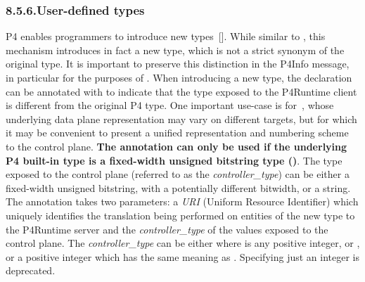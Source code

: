 \documentclass[11pt]{article}
\begin{document}
{%
\subsubsection{8.5.6.\hspace*{0.5em}User-defined types}\label{sec-user-defined-types}%

\noindent{}P4 enables programmers to introduce new types~[]. While similar
to , this mechanism introduces in fact a new type, which is not a
strict synonym of the original type. It is important to preserve this
distinction in the P4Info message, in particular for the purposes of
. When introducing a new type, the
declaration can be annotated with  to indicate that the
type exposed to the P4Runtime client is different from the original P4 type. One
important use-case is for~,
whose underlying data plane representation may vary on different targets, but
for which it may be convenient to present a unified representation and numbering
scheme to the control plane. \textbf{The  annotation can only
be used if the underlying P4 built-in type is a fixed-width unsigned bitstring
type ()}. The type exposed to the control plane (referred to as the
\emph{controller\_type}) can be either a fixed-width unsigned bitstring, with a
potentially different bitwidth, or a string. The annotation takes two
parameters: a \emph{URI} (Uniform Resource Identifier) which uniquely identifies the
translation being performed on entities of the new type to the P4Runtime server
and the \emph{controller\_type} of the values exposed to the control plane. The
\emph{controller\_type} can be either  where  is any positive integer, or
, or a positive integer  which has the same meaning as .
Specifying just an integer is deprecated.%

}
\end{document}
